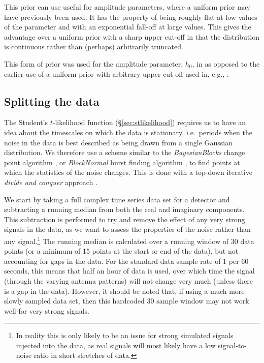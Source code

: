 This prior can use useful for amplitude parameters, where a uniform prior may have previously been used. It has the property of being roughly
flat at low values of the parameter and with an exponential fall-off at large values. This gives the advantage over a uniform prior with a
sharp upper cut-off in that the distribution is continuous rather than (perhaps) arbitrarily truncated.

This form of prior was used for the \gw amplitude parameter, $h_0$, in \citet{2017arXiv170107709T} as opposed to the earlier use of
a uniform prior with arbitrary upper cut-off used in, e.g., \citet{2014ApJ...785..119A}.

\subsection{Splitting the data}\label{sec:splitting}

The Student's $t$-likelihood function (\S\ref{sec:stlikelihood}) requires us to have an idea about the timescales on which the data is
stationary, i.e.\ periods when the noise in the data is best described as being drawn from a single
Gaussian distribution. We therefore use a scheme similar to the {\it BayesianBlocks} change point algorithm
\citep{1998ApJ...504..405S}, or {\it BlockNormal} \gw burst finding algorithm \citep{2004CQGra..21S1705M}, to find points at which the statistics of the
noise changes. This is done with a top-down iterative {\it divide and conquer} approach \citep{2000physics...9033S}.

We start by taking a full complex time series data set for a detector and subtracting a running median from both
the real and imaginary components. This
subtraction is performed to try and remove the effect of any very strong signals in the data, as we want to
assess the properties of the noise rather than any signal.\footnote{In reality this is only likely to be an issue for strong
simulated signals injected into the data, as real signals will most likely have a low signal-to-noise ratio in short stretches of data.} The running median is calculated over a running window
of 30 data points (or a minimum of 15 points at the start or end of the data), but not accounting for gaps in the data.
For the standard data sample rate of
1 per 60 seconds, this means that half an hour of data is used, over which time the signal (through the varying antenna patterns) will not change
very much (unless there is a gap in the data). However, it should be noted that, if using a much more slowly sampled data set,
then this hardcoded 30 sample window may not work well for very strong signals.

